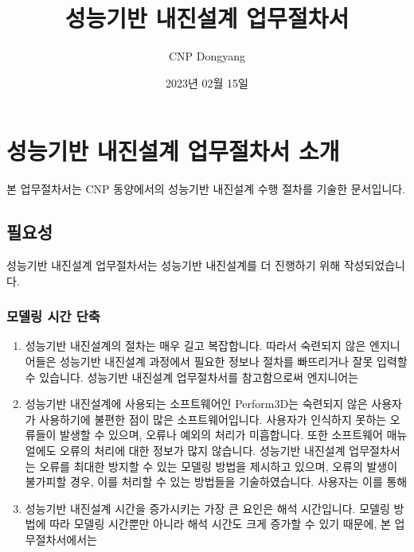 \documentclass[a4paper,11pt,korean,openany,oneside]{sphinxmanual}
\title{성능기반 내진설계 업무절차서}
\date{2023년 02월 15일}
\author{CNP Dongyang}
\begin{document}
\pagestyle{empty}
\sphinxmaketitle
\pagestyle{plain}
\sphinxtableofcontents
\pagestyle{normal}
\label{\detokenize{pbd_p3d_manual_latex::doc}}


\sphinxstepscope


\chapter{성능기반 내진설계 업무절차서 소개}
\label{\detokenize{0_intro_latex:id1}}\label{\detokenize{0_intro_latex::doc}}
\sphinxAtStartPar
본 업무절차서는 CNP 동양에서의 성능기반 내진설계 수행 절차를 기술한 문서입니다.


\section{필요성}
\label{\detokenize{0_intro_latex:id2}}
\sphinxAtStartPar
성능기반 내진설계 업무절차서는 성능기반 내진설계를 더  진행하기 위해 작성되었습니다.


\subsection{모델링 시간 단축}
\label{\detokenize{0_intro_latex:id3}}\begin{enumerate}
%
\item {} 
\sphinxAtStartPar
성능기반 내진설계의 절차는 매우 길고 복잡합니다.
따라서 숙련되지 않은 엔지니어들은 성능기반 내진설계 과정에서 필요한 정보나 절차를 빠뜨리거나 잘못 입력할 수 있습니다.
성능기반 내진설계 업무절차서를 참고함으로써 엔지니어는 

\item {} 
\sphinxAtStartPar
성능기반 내진설계에 사용되는 소프트웨어인 Perform\sphinxhyphen{}3D는 숙련되지 않은 사용자가 사용하기에 불편한 점이 많은 소프트웨어입니다.
사용자가 인식하지 못하는 오류들이 발생할 수 있으며, 오류나 예외의 처리가 미흡합니다. 또한 소프트웨어 매뉴얼에도 오류의 처리에 대한 정보가 많지 않습니다.
성능기반 내진설계 업무절차서는 오류를 최대한 방지할 수 있는 모델링 방법을 제시하고 있으며,
오류의 발생이 불가피할 경우, 이를 처리할 수 있는 방법들을 기술하였습니다.
사용자는 이를 통해 

\item {} 
\sphinxAtStartPar
성능기반 내진설계 시간을 증가시키는 가장 큰 요인은 해석 시간입니다.
모델링 방법에 따라 모델링 시간뿐만 아니라 해석 시간도 크게 증가할 수 있기 때문에,
본 업무절차서에서는 

\end{enumerate}
\end{document}
